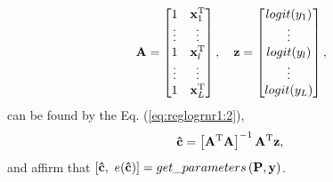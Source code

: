 \begin{equation}
\MATRIX{A}=
\begin{bmatrix}
1 & \VECTOR{x}_1^{\transpose}\\
\vdots & \vdots\\
1 & \VECTOR{x}_l^{\transpose}\\
\vdots & \vdots\\
1 & \VECTOR{x}_L^{\transpose}\\ 
\end{bmatrix},
\quad
\VECTOR{z}=
\begin{bmatrix}
logit(y_1)  \\
\vdots  \\
logit(y_l)  \\
\vdots \\
logit(y_L) \\
\end{bmatrix},
\end{equation}
can be found by the Eq. (\ref{eq:reglogrnr1:2}), 
\begin{equation}\label{eq:reglogrnr1:2}
\VECTOR{\hat{c}} = \left[ \MATRIX{A}^{\transpose} \MATRIX{A}\right]^{-1} \MATRIX{A}^{\transpose} \VECTOR{z},\\
\end{equation}
and affirm that $[\VECTOR{\hat{c}},~e(\VECTOR{\hat{c}})]=get\_parameters\left( \MATRIX{P}, \VECTOR{y}\right)$.

